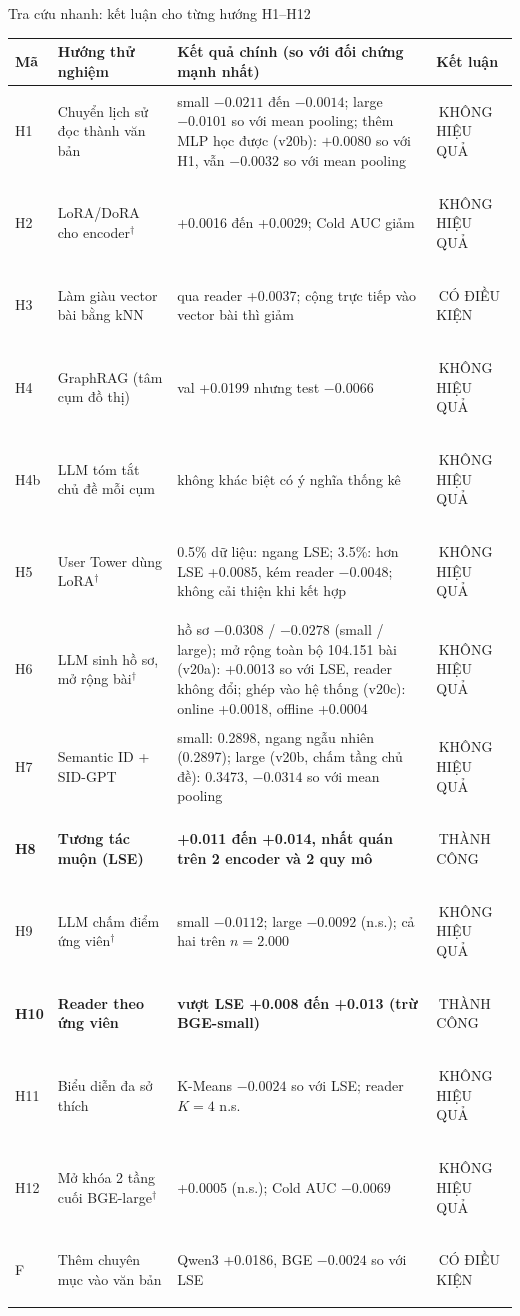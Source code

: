 \documentclass[aspectratio=169,t]{beamer}
\newcommand{\nhanS}[2]{{\setlength{\fboxsep}{0.8pt}\colorbox{#1}{\tiny\bfseries\color{white}\rule[-1.1pt]{0pt}{5.6pt}\,#2\,}}}
\newcommand{\OKs}{\nhanS{okc}{THÀNH CÔNG}}
\newcommand{\PARTs}{\nhanS{partc}{CÓ ĐIỀU KIỆN}}
\newcommand{\FAILs}{\nhanS{failc}{KHÔNG HIỆU QUẢ}}
\begin{document}
\begin{frame}[shrink]{Tra cứu nhanh: kết luận cho từng hướng H1--H12}
\scriptsize
\renewcommand{\arraystretch}{0.96}
\setlength{\tabcolsep}{3pt}
\begin{tabularx}{\textwidth}{@{}P{0.9cm}P{3.85cm}YP{2.15cm}@{}}
\toprule
\textbf{Mã} & \textbf{Hướng thử nghiệm} & \textbf{Kết quả chính (so với đối chứng mạnh nhất)} & \textbf{Kết luận}\\
\midrule
H1 & Chuyển lịch sử đọc thành văn bản & small $-0.0211$ đến $-0.0014$; large $-0.0101$ so với mean pooling; thêm MLP học được (v20b): $+0.0080$ so với H1, vẫn $-0.0032$ so với mean pooling & \FAILs\\
H2 & LoRA/DoRA cho encoder$^{\dagger}$ & +0.0016 đến +0.0029; Cold AUC giảm & \FAILs\\
H3 & Làm giàu vector bài bằng kNN & qua reader +0.0037; cộng trực tiếp vào vector bài thì giảm & \PARTs\\
H4 & GraphRAG (tâm cụm đồ thị) & val +0.0199 nhưng test $-0.0066$ & \FAILs\\
H4b & LLM tóm tắt chủ đề mỗi cụm & không khác biệt có ý nghĩa thống kê & \FAILs\\
H5 & User Tower dùng LoRA$^{\dagger}$ & 0.5\% dữ liệu: ngang LSE; 3.5\%: hơn LSE +0.0085, kém reader $-0.0048$; không cải thiện khi kết hợp & \FAILs\\
H6 & LLM sinh hồ sơ, mở rộng bài$^{\dagger}$ & hồ sơ $-0.0308$ / $-0.0278$ (small / large); mở rộng toàn bộ 104.151 bài (v20a): +0.0013 so với LSE, reader không đổi; ghép vào hệ thống (v20c): online +0.0018, offline +0.0004 & \FAILs\\
H7 & Semantic ID + SID-GPT & small: 0.2898, ngang ngẫu nhiên (0.2897); large (v20b, chấm tầng chủ đề): 0.3473, $-0.0314$ so với mean pooling & \FAILs\\
\textbf{H8} & \textbf{Tương tác muộn (LSE)} & \textbf{+0.011 đến +0.014, nhất quán trên 2 encoder và 2 quy mô} & \OKs\\
H9 & LLM chấm điểm ứng viên$^{\dagger}$ & small $-0.0112$; large $-0.0092$ (n.s.); cả hai trên $n=2.000$ & \FAILs\\
\textbf{H10} & \textbf{Reader theo ứng viên} & \textbf{vượt LSE +0.008 đến +0.013 (trừ BGE-small)} & \OKs\\
H11 & Biểu diễn đa sở thích & K-Means $-0.0024$ so với LSE; reader $K=4$ n.s. & \FAILs\\
H12 & Mở khóa 2 tầng cuối BGE-large$^{\dagger}$ & +0.0005 (n.s.); Cold AUC $-0.0069$ & \FAILs\\
F & Thêm chuyên mục vào văn bản & Qwen3 +0.0186, BGE $-0.0024$ so với LSE & \PARTs\\
\bottomrule
\end{tabularx}
\par\kern0pt%
\end{frame}
\end{document}
